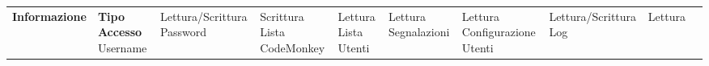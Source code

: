\begin{center}
    \phantom{M}%


    \begin{tabularx}
        {\textwidth} {|X|X|}
        \hline  {}
        \n      {}
        \large \textbf{Informazione}  & \centering\large\textbf{Tipo Accesso}
        \n      Username              & Lettura/Scrittura
        \n      Password              & Scrittura
        \n      Lista CodeMonkey      & Lettura
        \n      Lista Utenti          & Lettura
        \n      Segnalazioni          & Lettura
        \n      Configurazione Utenti & Lettura/Scrittura
        \n      Log                   & Lettura
        \n
    \end{tabularx}\label{tab:monkeytable:problema:tabellaRuoloInformazioni:Amministratore}
\end{center}
